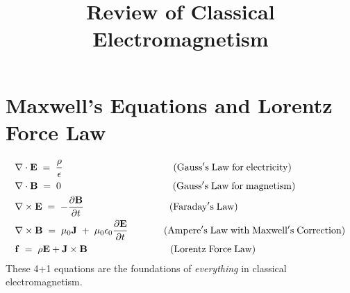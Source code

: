 \documentclass[12pt,a4paper]{article}
\begin{document}
\title{ \vspace{-3cm} Review of Classical Electromagnetism}
\date{}
\maketitle


\section{Maxwell's Equations and Lorentz Force Law}

\begin{align}
&\nabla \cdot \mathbf{E} \; = \; \frac{\rho}{\epsilon} \hspace{4cm} (\mathrm{Gauss's \; Law \; for \; electricity}) \label{eqn:gaus_e}\\
&\nabla \cdot \mathbf{B} \; = \; 0  \hspace{4.05cm} (\mathrm{Gauss's \; Law \; for \; magnetism}) \label{eqn:gaus_m}\\
&\nabla \times \mathbf{E} \; = \; -\frac{\partial \mathbf{B}}{\partial t}  \hspace{3.1cm} (\mathrm{Faraday's \; Law}) \label{eqn:faraday}\\
&\nabla \times \mathbf{B} \; = \; \mu_{0} \mathbf{J} \; + \; \mu_{0} \epsilon_{0} \frac{\partial \mathbf{E}}{\partial t}  \hspace{1.3cm} (\mathrm{Ampere's \; Law \; with \; Maxwell's \; Correction}) \label{eqn:ampere}\\
&\mathbf{f} \; = \; \rho \mathbf{E} + \mathbf{J} \times \mathbf{B}  \hspace{3cm} (\mathrm{Lorentz \; Force \; Law}) \label{eqn:lorentz}
\end{align}
These 4+1 equations are the foundations of \textit{everything} in classical electromagnetism.
\end{document}
